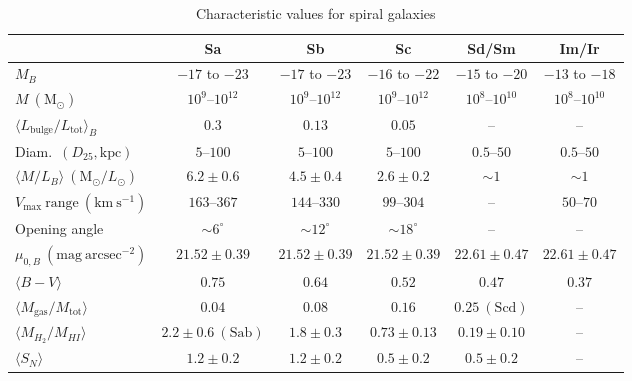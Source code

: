 \documentclass[a4paper,11pt]{report}
\begin{document}
\begin{table}[h!]
\centering
\caption{Characteristic values for spiral galaxies}
\begin{tabular}{lccccc}
\hline
 & Sa & Sb & Sc & Sd/Sm & Im/Ir \\
\hline

$M_B$
& $-17$ to $-23$
& $-17$ to $-23$
& $-16$ to $-22$
& $-15$ to $-20$
& $-13$ to $-18$ \\

$M\ (\mathrm{M}_\odot)$
& $10^{9}$--$10^{12}$
& $10^{9}$--$10^{12}$
& $10^{9}$--$10^{12}$
& $10^{8}$--$10^{10}$
& $10^{8}$--$10^{10}$ \\

$\langle L_{\mathrm{bulge}}/L_{\mathrm{tot}} \rangle_B$
& $0.3$
& $0.13$
& $0.05$
& --
& -- \\

Diam.\ $(D_{25}, \mathrm{kpc})$
& $5$--$100$
& $5$--$100$
& $5$--$100$
& $0.5$--$50$
& $0.5$--$50$ \\

$\langle M/L_B \rangle\ (\mathrm{M}_\odot/L_\odot)$
& $6.2 \pm 0.6$
& $4.5 \pm 0.4$
& $2.6 \pm 0.2$
& $\sim 1$
& $\sim 1$ \\

$V_{\max}\ \mathrm{range}\ (\mathrm{km\ s^{-1}})$
& $163$--$367$
& $144$--$330$
& $99$--$304$
& --
& $50$--$70$ \\

Opening angle
& $\sim 6^\circ$
& $\sim 12^\circ$
& $\sim 18^\circ$
& --
& -- \\

$\mu_{0,B}\ (\mathrm{mag\ arcsec^{-2}})$
& $21.52 \pm 0.39$
& $21.52 \pm 0.39$
& $21.52 \pm 0.39$
& $22.61 \pm 0.47$
& $22.61 \pm 0.47$ \\

$\langle B - V \rangle$
& $0.75$
& $0.64$
& $0.52$
& $0.47$
& $0.37$ \\

$\langle M_{\mathrm{gas}}/M_{\mathrm{tot}} \rangle$
& $0.04$
& $0.08$
& $0.16$
& $0.25\ (\mathrm{Scd})$
& -- \\

$\langle M_{H_2}/M_{HI} \rangle$
& $2.2 \pm 0.6\ (\mathrm{Sab})$
& $1.8 \pm 0.3$
& $0.73 \pm 0.13$
& $0.19 \pm 0.10$
& -- \\

$\langle S_N \rangle$
& $1.2 \pm 0.2$
& $1.2 \pm 0.2$
& $0.5 \pm 0.2$
& $0.5 \pm 0.2$
& -- \\

\hline
\end{tabular}


\end{table}
\end{document}
